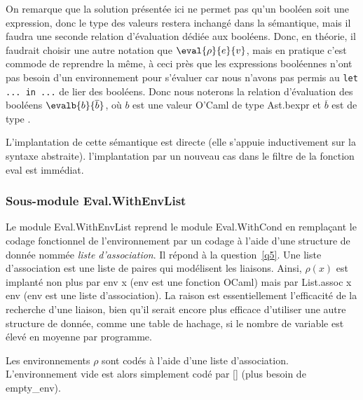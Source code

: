 \documentclass[a4paper,11pt]{article}
\newcommand{\inferlabel}[1]{\inferrule*[right=\textsc{#1}]}
\begin{document}
On remarque que la solution présentée ici ne permet pas qu'un booléen
soit une expression, donc le type des valeurs restera inchangé dans la
sémantique, mais il faudra une seconde relation d'évaluation dédiée
aux booléens. Donc, en théorie, il faudrait choisir une autre notation
que $\eval{\rho}{e}{v}$, mais en pratique c'est commode de reprendre
la même, à ceci près que les expressions booléennes n'ont pas besoin
d'un environnement pour s'évaluer car nous n'avons pas permis au
\texttt{let ... in ...} de lier des booléens. Donc nous noterons la
relation d'évaluation des booléens $\evalb{b}{\overline{b}}$, où $b$
est une valeur O'Caml de type \textsf{Ast.bexpr} et $\overline{b}$ est de
type .


L'implantation de cette sémantique est directe (elle s'appuie
inductivement sur la syntaxe abstraite). l'implantation par un nouveau
cas dans le filtre de la fonction \textsf{eval} est immédiat.

\subsubsection{Sous-module \textsf{Eval.WithEnvList}}
\label{Eval.WithEnvList}

Le module \textsf{Eval.WithEnvList} reprend le module
\textsf{Eval.WithCond} en remplaçant le codage fonctionnel de
l'environnement par un codage à l'aide d'une structure de donnée
nommée \emph{liste d'association}. Il répond à la
question~\ref{q5}. Une liste d'association est une liste de paires qui
modélisent les liaisons. Ainsi, $\rho(x)$ est implanté non plus par
\textsf{env x} (\textsf{env} est une fonction OCaml) mais par
\textsf{List.assoc x env} (\textsf{env} est une liste
d'association). La raison est essentiellement l'efficacité de la
recherche d'une liaison, bien qu'il serait encore plus efficace
d'utiliser une autre structure de donnée, comme une table de hachage,
si le nombre de variable est élevé en moyenne par programme.

Les environnements $\rho$ sont codés à l'aide d'une liste
d'association. L'envi\-ron\-nement vide est alors simplement codé par
\textsf{[\;]} (plus besoin de \textsf{empty\_env}).
\end{document}
